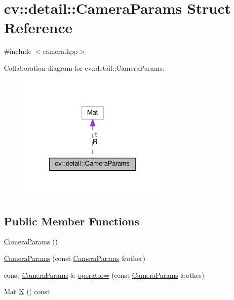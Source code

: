 \hypertarget{structcv_1_1detail_1_1CameraParams}{\section{cv\-:\-:detail\-:\-:Camera\-Params Struct Reference}
\label{structcv_1_1detail_1_1CameraParams}
}


{\ttfamily \#include $<$camera.\-hpp$>$}



Collaboration diagram for cv\-:\-:detail\-:\-:Camera\-Params\-:\nopagebreak
\begin{figure}[H]
\begin{center}
\leavevmode
\includegraphics[width=210pt]{structcv_1_1detail_1_1CameraParams__coll__graph}
\end{center}
\end{figure}
\subsection*{Public Member Functions}
\begin{DoxyCompactItemize}
\item 
\hyperlink{structcv_1_1detail_1_1CameraParams_a1fe82496bda9faaecacd5c7625bc0093}{Camera\-Params} ()
\item 
\hyperlink{structcv_1_1detail_1_1CameraParams_a3d90371d2e87a3ac638e3cd9109381c1}{Camera\-Params} (const \hyperlink{structcv_1_1detail_1_1CameraParams}{Camera\-Params} \&other)
\item 
const \hyperlink{structcv_1_1detail_1_1CameraParams}{Camera\-Params} \& \hyperlink{structcv_1_1detail_1_1CameraParams_a17435dbae479a19ee66433d22de3ddce}{operator=} (const \hyperlink{structcv_1_1detail_1_1CameraParams}{Camera\-Params} \&other)
\item 
Mat \hyperlink{structcv_1_1detail_1_1CameraParams_a83200e8781f60fdff8a6bb8dcfbf0b73}{K} () const 
\end{DoxyCompactItemize}
